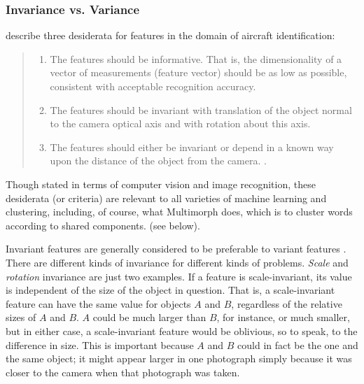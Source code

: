 \subsubsection{Invariance vs. Variance}
\cite{dudani-et-al:1977} describe three desiderata for features in the 
domain of aircraft identification:
\begin{quote}
\begin{enumerate}
\item The features should be informative. That is, the dimensionality of a 
vector of measurements (feature vector) should be as low as possible, 
consistent with acceptable recognition accuracy.
\item The features should be invariant with translation of the object 
normal to the camera optical axis and with rotation about this axis.
\item The features should either be invariant or depend in a known 
way upon the distance of the object from the camera.
\citep[][p. 40]{dudani-et-al:1977}.
\end{enumerate}
\end{quote}
Though stated in terms of computer vision and image recognition, 
these desiderata (or criteria) are relevant to all varieties of machine 
learning and clustering, including, of course, what Multimorph does, which is to
cluster words according to shared components.  
(see below).

Invariant features are generally considered to be preferable to variant 
features \citep{hossain-et-al:2012}. 
There are different kinds of invariance for different kinds of problems.
\emph{Scale} and \emph{rotation} invariance are just two examples. If a feature 
is scale-invariant, its
value is independent of the size of the object in question. That is, a 
scale-invariant feature
can have the same value for objects $A$ and $B$, regardless of the 
relative sizes of $A$ and $B$. $A$ could be much larger than $B$, for instance, or much smaller,
but in either case, a scale-invariant feature would be oblivious, so to speak, to the difference in size. 
This is important because $A$ and $B$ could in fact be the one and the same object; it might appear 
larger in one photograph simply because 
it was closer to the camera when that photograph was taken.

